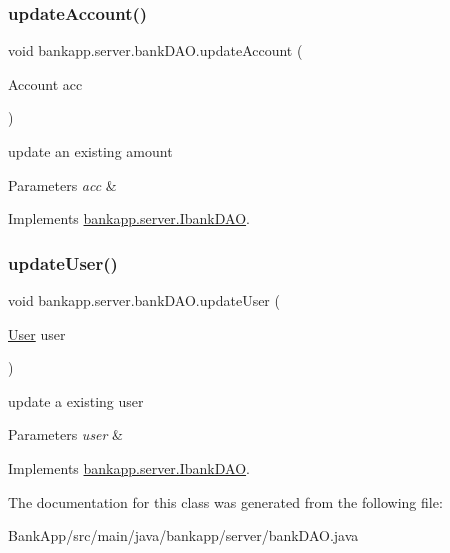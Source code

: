 \subsubsection{\texorpdfstring{update\+Account()}{updateAccount()}}
{\footnotesize\ttfamily void bankapp.\+server.\+bank\+D\+A\+O.\+update\+Account (\begin{DoxyParamCaption}\item[{Account}]{acc }\end{DoxyParamCaption})}



update an existing amount 


\begin{DoxyParams}{Parameters}
{\em acc} & \\
\hline
\end{DoxyParams}


Implements \hyperlink{interfacebankapp_1_1server_1_1IbankDAO_a0ee7aa6b093e2695955296dd72411b0c}{bankapp.\+server.\+Ibank\+D\+AO}.

\mbox{\label{classbankapp_1_1server_1_1bankDAO_ab3ed5a9b972ea31ebc023596efecb2d1}} 
\subsubsection{\texorpdfstring{update\+User()}{updateUser()}}
{\footnotesize\ttfamily void bankapp.\+server.\+bank\+D\+A\+O.\+update\+User (\begin{DoxyParamCaption}\item[{\hyperlink{classbankapp_1_1server_1_1User}{User}}]{user }\end{DoxyParamCaption})}



update a existing user 


\begin{DoxyParams}{Parameters}
{\em user} & \\
\hline
\end{DoxyParams}


Implements \hyperlink{interfacebankapp_1_1server_1_1IbankDAO_a5c38ce2000e71e9c9892bf2d357103bc}{bankapp.\+server.\+Ibank\+D\+AO}.



The documentation for this class was generated from the following file\+:\begin{DoxyCompactItemize}
\item 
Bank\+App/src/main/java/bankapp/server/bank\+D\+A\+O.\+java\end{DoxyCompactItemize}
